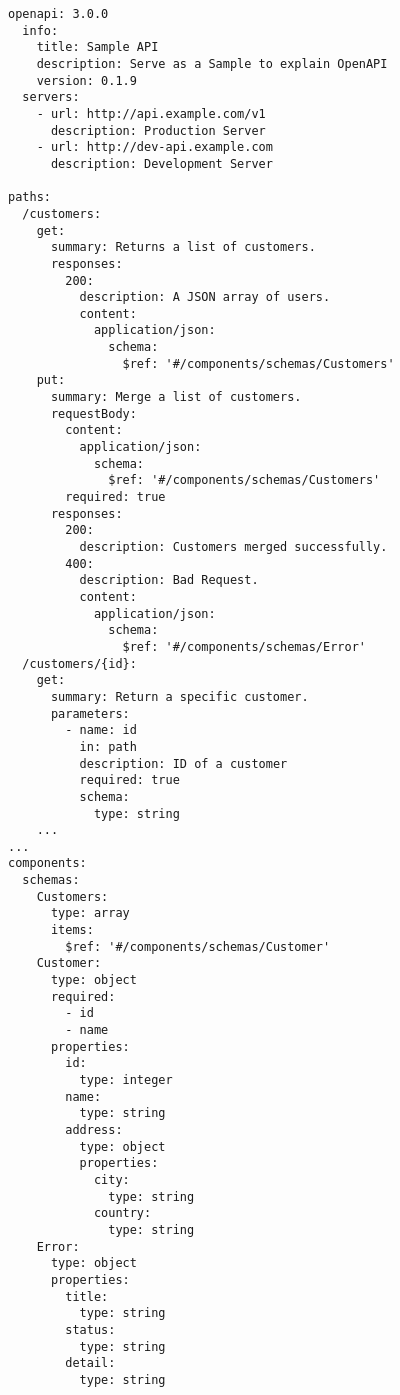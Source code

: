\begin{lstlisting}[basicstyle=\tiny, caption=Sample OpenAPI Document, captionpos=b, label=lst:SampleOpenAPI]
openapi: 3.0.0
  info:
    title: Sample API
    description: Serve as a Sample to explain OpenAPI
    version: 0.1.9
  servers:
    - url: http://api.example.com/v1
      description: Production Server
    - url: http://dev-api.example.com
      description: Development Server
	
paths:
  /customers:
    get:
      summary: Returns a list of customers.
      responses:
        200:
          description: A JSON array of users.
          content:
            application/json:
              schema:
                $ref: '#/components/schemas/Customers'
    put:
      summary: Merge a list of customers.
      requestBody:
        content:
          application/json:
            schema:
              $ref: '#/components/schemas/Customers'
        required: true
      responses:
        200:
          description: Customers merged successfully.
        400:
          description: Bad Request.
          content:
            application/json:
              schema:
                $ref: '#/components/schemas/Error'
  /customers/{id}:
    get:
      summary: Return a specific customer.
      parameters:
        - name: id
          in: path
          description: ID of a customer
          required: true
          schema:
            type: string
    ...
...
components:
  schemas:
    Customers:
      type: array
      items:
        $ref: '#/components/schemas/Customer'
    Customer:
      type: object
      required:
        - id
        - name
      properties:
        id:
          type: integer
        name:
          type: string
        address:
          type: object
          properties:
            city:
              type: string
            country:
              type: string
    Error:
      type: object
      properties:
        title:
          type: string
        status:
          type: string
        detail:
          type: string
\end{lstlisting}

